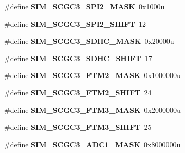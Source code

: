 \begin{DoxyCompactItemize}
\item 
\#define {\bfseries S\+I\+M\+\_\+\+S\+C\+G\+C3\+\_\+\+S\+P\+I2\+\_\+\+M\+A\+SK}~0x1000u\hypertarget{group__SIM__Register__Masks_gab2d7534554a2c4f57d887acc3d78f872}{}\label{group__SIM__Register__Masks_gab2d7534554a2c4f57d887acc3d78f872}

\item 
\#define {\bfseries S\+I\+M\+\_\+\+S\+C\+G\+C3\+\_\+\+S\+P\+I2\+\_\+\+S\+H\+I\+FT}~12\hypertarget{group__SIM__Register__Masks_ga49d1bb03182f3a731fcf50dffaa8a423}{}\label{group__SIM__Register__Masks_ga49d1bb03182f3a731fcf50dffaa8a423}

\item 
\#define {\bfseries S\+I\+M\+\_\+\+S\+C\+G\+C3\+\_\+\+S\+D\+H\+C\+\_\+\+M\+A\+SK}~0x20000u\hypertarget{group__SIM__Register__Masks_gac39a09b468d8bb54c31b9b470e53e26b}{}\label{group__SIM__Register__Masks_gac39a09b468d8bb54c31b9b470e53e26b}

\item 
\#define {\bfseries S\+I\+M\+\_\+\+S\+C\+G\+C3\+\_\+\+S\+D\+H\+C\+\_\+\+S\+H\+I\+FT}~17\hypertarget{group__SIM__Register__Masks_gab3bd17015713c00477953e717801d5bd}{}\label{group__SIM__Register__Masks_gab3bd17015713c00477953e717801d5bd}

\item 
\#define {\bfseries S\+I\+M\+\_\+\+S\+C\+G\+C3\+\_\+\+F\+T\+M2\+\_\+\+M\+A\+SK}~0x1000000u\hypertarget{group__SIM__Register__Masks_gafe5009515ab0955d724fa5306171aeeb}{}\label{group__SIM__Register__Masks_gafe5009515ab0955d724fa5306171aeeb}

\item 
\#define {\bfseries S\+I\+M\+\_\+\+S\+C\+G\+C3\+\_\+\+F\+T\+M2\+\_\+\+S\+H\+I\+FT}~24\hypertarget{group__SIM__Register__Masks_gaa31635b220d66ac1a6f8f59b3d64cc6e}{}\label{group__SIM__Register__Masks_gaa31635b220d66ac1a6f8f59b3d64cc6e}

\item 
\#define {\bfseries S\+I\+M\+\_\+\+S\+C\+G\+C3\+\_\+\+F\+T\+M3\+\_\+\+M\+A\+SK}~0x2000000u\hypertarget{group__SIM__Register__Masks_ga5e148c582c15e4caa9bf69c5229562ec}{}\label{group__SIM__Register__Masks_ga5e148c582c15e4caa9bf69c5229562ec}

\item 
\#define {\bfseries S\+I\+M\+\_\+\+S\+C\+G\+C3\+\_\+\+F\+T\+M3\+\_\+\+S\+H\+I\+FT}~25\hypertarget{group__SIM__Register__Masks_gaf6e5e9833e8a4ff9b18aabe19b7e625b}{}\label{group__SIM__Register__Masks_gaf6e5e9833e8a4ff9b18aabe19b7e625b}

\item 
\#define {\bfseries S\+I\+M\+\_\+\+S\+C\+G\+C3\+\_\+\+A\+D\+C1\+\_\+\+M\+A\+SK}~0x8000000u\hypertarget{group__SIM__Register__Masks_gaf26716d3c8b3d13168bbb2c879e69db1}{}\label{group__SIM__Register__Masks_gaf26716d3c8b3d13168bbb2c879e69db1}


\end{DoxyCompactItemize}

